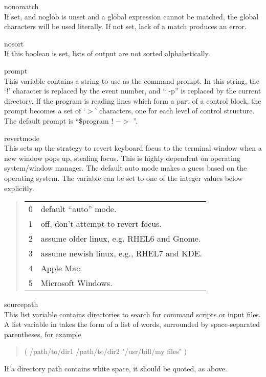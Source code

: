 \begin{description}
\item{\et nonomatch}\\
If set, and {\et noglob} is unset and a global expression cannot be
matched, the global characters will be used literally.  If not set,
lack of a match produces an error.

\item{\et nosort}\\
If this boolean is set, lists of output are not sorted alphabetically.

\item{\et prompt}\\
This variable contains a string to use as the command prompt.  In this
string, the `!' character is replaced by the event number, and ``{\vt
-p}'' is replaced by the current directory.  If the program is reading
lines which form a part of a control block, the prompt becomes a set
of `$>$' characters, one for each level of control structure.  The
default prompt is ``{\vt \$program !  $->$ }''.

\item{\et revertmode}\\
This sets up the strategy to revert keyboard focus to the terminal
window when a new window pops up, stealing focus.  This is highly
dependent on operating system/window manager.  The default auto mode
makes a guess based on the operating system.  The variable can be set
to one of the integer values below explicitly.
\begin{quote}
\begin{tabular}{ll}
0 & default ``auto'' mode.\\
1 & off, don't attempt to revert focus.\\
2 & assume older linux, e.g. RHEL6 and Gnome.\\
3 & assume newish linux, e.g., RHEL7 and KDE.\\
4 & Apple Mac.\\
5 & Microsoft Windows.\\
\end{tabular}
\end{quote}

\item{\et sourcepath}\\
This list variable contains directories to search for command scripts
or input files.  A list variable in {\WRspice} takes the form of a
list of words, surrounded by space-separated parentheses, for example
\begin{quote}\vt
( /path/to/dir1 /path/to/dir2 "/usr/bill/my files" )
\end{quote}
If a directory path contains white space, it should be quoted, as
above.


\end{description}
